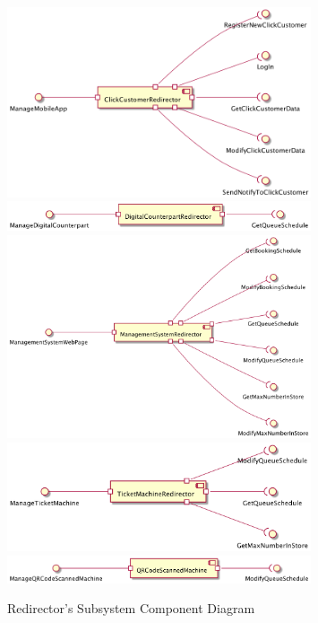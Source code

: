 \documentclass[a4paper,12pt]{report}
\begin{document}
\begin{figure}
	\centering
	\includegraphics[width=0.8\textwidth]{component_diagram_ClickCustomerRedirector}
	\vspace{10mm}
	\includegraphics[width=0.8\textwidth]{component_diagram_DigitalCounterpartRedirector}
	\vspace{10mm}
	\includegraphics[width=0.8\textwidth]{component_diagram_ManagementSystemRedirector}
	\vspace{10mm}
	\includegraphics[width=0.8\textwidth]{component_diagram_TicketMachineRedirector}
	\vspace{10mm}
	\includegraphics[width=0.8\textwidth]{component_diagram_QRMachine}
	\vspace{10mm}
	\caption{Redirector's Subsystem Component Diagram}
	\centering
	\label{fig:component_diagram_RedirectoSubsystem}
\end{figure}
\end{document}
